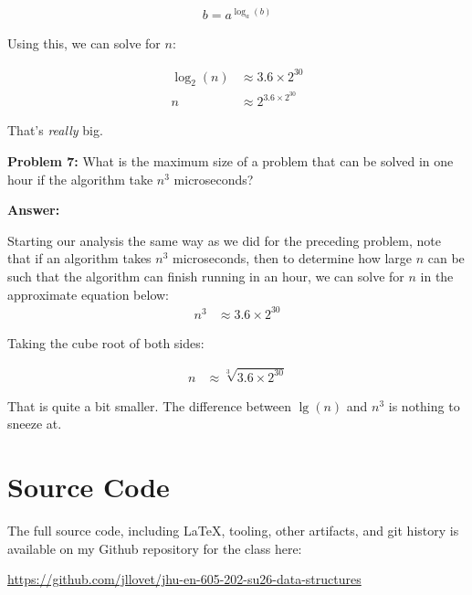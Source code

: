 \documentclass[12pt,letterpaper,final]{report}
\begin{document}
\begin{align*}
  b = a^{\log_{a}(b)}
\end{align*}

Using this, we can solve for $n$:

\begin{align*}
  \log_{2}(n) & \approx 3.6 \times 2^{30}                              \\
  n           & \approx 2^{3.6 \times 2^{30}} \label{by def of $\log$}
\end{align*}

That's \emph{really} big.

\bigskip
\noindent\textbf{Problem 7:} What is the maximum size of a problem that can be solved in one hour if the algorithm take $n^3$ microseconds?

\noindent\textbf{Answer:}

Starting our analysis the same way as we did for the preceding problem, note that if an algorithm takes $n^3$ microseconds, then to determine how large $n$ can be such that the algorithm can finish running in an hour, we can solve for $n$ in the approximate equation below:
\begin{align*}
  n^3 & \approx 3.6 \times 2^{30}
\end{align*}

Taking the cube root of both sides:

\begin{align*}
  n & \approx \sqrt[3]{3.6 \times 2^{30}}
\end{align*}

That is quite a bit smaller. The difference between $\lg(n)$ and $n^3$ is nothing to sneeze at.

\pagebreak

\section*{Source Code}
The full source code, including LaTeX, tooling, other artifacts, and git history is available on my Github repository for the class here:
\begin{center}
  \url{https://github.com/jllovet/jhu-en-605-202-su26-data-structures}
\end{center}

\printbibliography
\end{document}
